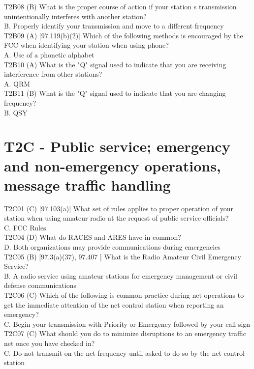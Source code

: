 \documentclass[12pt,letterpaper]{report}
\begin{document}
T2B08 (B) What is the proper course of action if your station s transmission unintentionally interferes with another station?\\
B. Properly identify your transmission and move to a different frequency\\

T2B09 (A) [97.119(b)(2)] Which of the following methods is encouraged by the FCC when identifying your station when using phone?\\
A. Use of a phonetic alphabet\\

T2B10 (A) What is the "Q" signal used to indicate that you are receiving interference from other stations?\\
A. QRM\\

T2B11 (B) What is the "Q" signal used to indicate that you are changing frequency?\\
B. QSY\\

\section{T2C - Public service; emergency and non-emergency operations, message traffic handling}

T2C01 (C) [97.103(a)] What set of rules applies to proper operation of your station when using amateur radio at the request of public service officials?\\
C. FCC Rules\\

T2C04 (D) What do RACES and ARES have in common?\\
D. Both organizations may provide communications during emergencies\\

T2C05 (B) [97.3(a)(37), 97.407 ] What is the Radio Amateur Civil Emergency Service?\\
B. A radio service using amateur stations for emergency management or civil defense communications\\

T2C06 (C) Which of the following is common practice during net operations to get the immediate attention of the net control station when reporting an emergency?\\
C. Begin your transmission with  Priority  or  Emergency  followed by your call sign\\

T2C07 (C) What should you do to minimize disruptions to an emergency traffic net once you have checked in?\\
C. Do not transmit on the net frequency until asked to do so by the net control station\\
\end{document}
